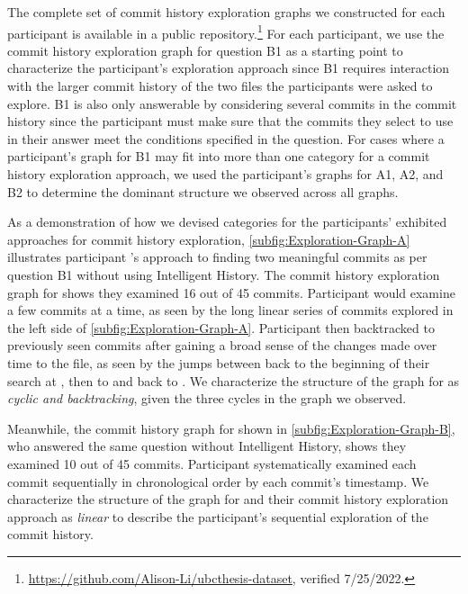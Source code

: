 The complete set of commit history exploration graphs we constructed
for each participant is available in a public repository.\footnote{\url{https://github.com/Alison-Li/ubcthesis-dataset}, verified 7/25/2022.}
For each participant, we use the commit history exploration graph for question B1
as a starting point to characterize the participant's exploration approach since
B1 requires interaction with the larger commit history of the two files the participants were asked to explore.
B1 is also only answerable by considering several commits in the commit history since the
participant must make sure that the commits they select to use in their answer meet the conditions specified in the question.
For cases where a participant's graph for B1 may fit into more than one category for a commit history exploration approach,
we used the participant's graphs for A1, A2, and B2 to determine the dominant structure we observed across all graphs.

As a demonstration of how we devised categories for the participants' exhibited approaches for commit history exploration, 
\autoref{subfig:Exploration-Graph-A} illustrates participant 's approach to finding 
two meaningful commits as per question B1 without using Intelligent History.
The commit history exploration graph for  shows they examined 16 out of 45 commits.
Participant  would examine a few commits at a time,
as seen by the long linear series of commits explored in the left side of \autoref{subfig:Exploration-Graph-A}.
Participant  then backtracked to previously seen commits 
after gaining a broad sense of the changes made over time to the file,
as seen by the jumps between  back to the beginning of their search at , 
then to  and back to .
We characterize the structure of the graph for  as \textit{cyclic and backtracking},
given the three cycles in the graph we observed.

Meanwhile, the commit history graph for  shown in \autoref{subfig:Exploration-Graph-B}, 
who answered the same question without Intelligent History, shows they examined 10 out of 45 commits.
Participant  systematically examined 
each commit sequentially in chronological order by each commit's timestamp.
We characterize the structure of the graph for  and their commit history exploration approach as \textit{linear} 
to describe the participant's sequential exploration of the commit history.

